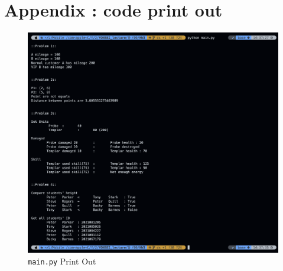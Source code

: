 \section*{Appendix : code print out}
\vspace{-2mm}
    \begin{figure}[!h]\centering
		\includegraphics[width=\textwidth]{image/report_03/01.png}
		\caption{\small \texttt{main.py} Print Out}
		\vspace{-10pt}
    \end{figure}